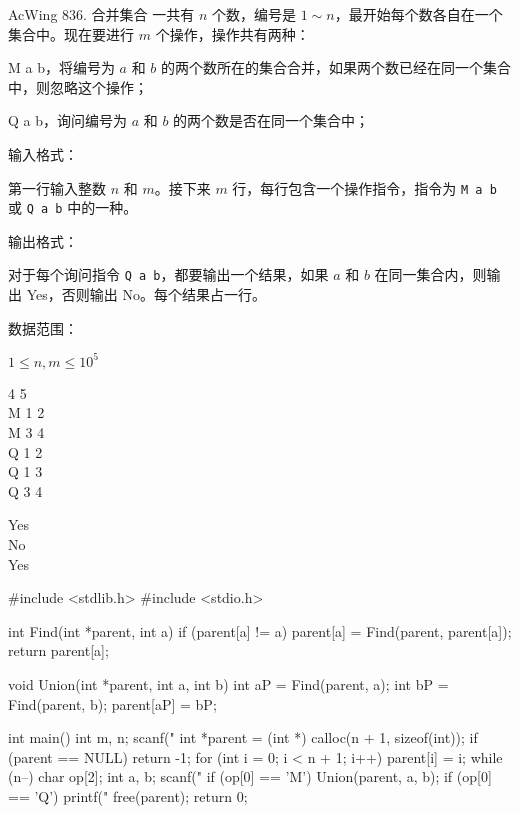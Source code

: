 \begin{titledbox}{AcWing 836. 合并集合}
一共有 $n$ 个数，编号是 $1 \sim n$，最开始每个数各自在一个集合中。现在要进行 $m$ 个操作，操作共有两种：

M a b，将编号为 $a$ 和 $b$ 的两个数所在的集合合并，如果两个数已经在同一个集合中，则忽略这个操作；

Q a b，询问编号为 $a$ 和 $b$ 的两个数是否在同一个集合中；

输入格式：

第一行输入整数 $n$ 和 $m$。接下来 $m$ 行，每行包含一个操作指令，指令为 \lstinline{M a b} 或 \lstinline{Q a b} 中的一种。

输出格式：

对于每个询问指令 \lstinline{Q a b}，都要输出一个结果，如果 $a$ 和 $b$ 在同一集合内，则输出 Yes，否则输出 No。每个结果占一行。

数据范围：

$1 \le n,m \le 10^5$
    
\begin{inputblock}
    4 5 \\
    M 1 2 \\
    M 3 4 \\
    Q 1 2 \\
    Q 1 3 \\
    Q 3 4
\end{inputblock}
\begin{outputblock}
    Yes \\
    No \\
    Yes
\end{outputblock}
\end{titledbox}

\begin{mycpptwocol}[合并集合]
#include <stdlib.h>
#include <stdio.h>

int Find(int *parent, int a)
{
    if (parent[a] != a) {
        parent[a] = Find(parent, parent[a]);
    }
    return parent[a];
}

void Union(int *parent, int a, int b)
{
    int aP = Find(parent, a);
    int bP = Find(parent, b);
    parent[aP] = bP;
}

int main()
{
    int m, n;
    scanf("%
    int *parent = (int *) calloc(n + 1, sizeof(int));
    if (parent == NULL) {
        return -1;
    }
    for (int i = 0; i < n + 1; i++) {
        parent[i] = i;
    }
    while (n--) {
        char op[2];
        int a, b;
        scanf("%
        if (op[0] == 'M') {
            Union(parent, a, b);
        }
        if (op[0] == 'Q') {
            printf("%
        }
    }
    free(parent);
    return 0;
}
\end{mycpptwocol}
